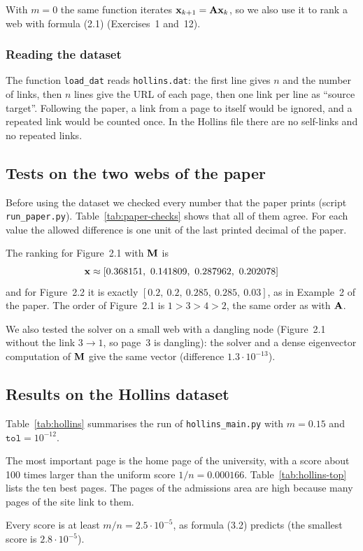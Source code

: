 With $m = 0$ the same function iterates $\mathbf{x}_{k+1} = \mathbf{A}\mathbf{x}_k$, so we also use it to rank a web with formula (2.1) (Exercises~1 and~12).

\subsubsection*{Reading the dataset}

The function \texttt{load\_dat} reads \texttt{hollins.dat}: the first line gives $n$ and the number of links, then $n$ lines give the URL of each page, then one link per line as ``source target''.
Following the paper, a link from a page to itself would be ignored, and a repeated link would be counted once.
In the Hollins file there are no self-links and no repeated links.

\subsection{Tests on the two webs of the paper}

Before using the dataset we checked every number that the paper prints (script \texttt{run\_paper.py}).
Table~\ref{tab:paper-checks} shows that all of them agree.
For each value the allowed difference is one unit of the last printed decimal of the paper.



The ranking for Figure~2.1 with $\mathbf{M}$ is
\[
  \vx \approx [0.368151,\ 0.141809,\ 0.287962,\ 0.202078]
\]
and for Figure~2.2 it is exactly $[0.2,\ 0.2,\ 0.285,\ 0.285,\ 0.03]$, as in Example~2 of the paper.
The order of Figure~2.1 is $1 > 3 > 4 > 2$, the same order as with $\mathbf{A}$.

We also tested the solver on a small web with a dangling node (Figure~2.1 without the link $3 \to 1$, so page~3 is dangling): the solver and a dense eigenvector computation of $\mathbf{M}$ give the same vector (difference $1.3\cdot10^{-13}$).

\subsection{Results on the Hollins dataset}
\label{sec:hollins}

Table~\ref{tab:hollins} summarises the run of \texttt{hollins\_main.py} with $m = 0.15$ and $\texttt{tol} = 10^{-12}$.



The most important page is the home page of the university, with a score about 100 times larger than the uniform score $1/n = 0.000166$.
Table~\ref{tab:hollins-top} lists the ten best pages.
The pages of the admissions area are high because many pages of the site link to them.



Every score is at least $m/n = 2.5\cdot10^{-5}$, as formula (3.2) predicts (the smallest score is $2.8\cdot10^{-5}$).
